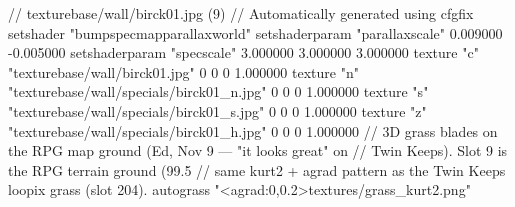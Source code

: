 // texturebase/wall/birck01.jpg (9)
// Automatically generated using cfgfix
setshader "bumpspecmapparallaxworld"
setshaderparam "parallaxscale" 0.009000 -0.005000
setshaderparam "specscale" 3.000000 3.000000 3.000000
texture "c" "texturebase/wall/birck01.jpg" 0 0 0 1.000000
texture "n" "texturebase/wall/specials/birck01_n.jpg" 0 0 0 1.000000
texture "s" "texturebase/wall/specials/birck01_s.jpg" 0 0 0 1.000000
texture "z" "texturebase/wall/specials/birck01_h.jpg" 0 0 0 1.000000
// 3D grass blades on the RPG map ground (Ed, Nov 9 — "it looks great" on
// Twin Keeps). Slot 9 is the RPG terrain ground (99.5%
// same kurt2 + agrad pattern as the Twin Keeps loopix grass (slot 204).
autograss "<agrad:0,0.2>textures/grass_kurt2.png"
